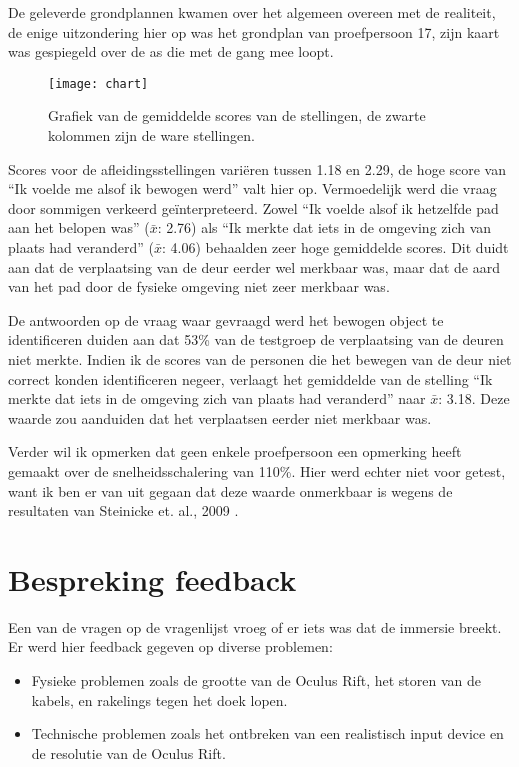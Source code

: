 De geleverde grondplannen kwamen over het algemeen overeen met de realiteit, de
enige uitzondering hier op was het grondplan van proefpersoon 17, zijn kaart was
gespiegeld over de as die met de gang mee loopt.

\begin{figure}[h!]
    \centering
    \texttt{[image: chart]}
    \caption{Grafiek van de gemiddelde scores van de stellingen, de zwarte 
    kolommen zijn de ware stellingen.}
    \label{fig:chart}
\end{figure}

Scores voor de afleidingsstellingen vari\"eren tussen 1.18 en 2.29, de hoge score
van ``Ik voelde me alsof ik bewogen werd'' valt hier op. Vermoedelijk werd die
vraag door sommigen verkeerd ge\"interpreteerd. Zowel ``Ik voelde alsof ik 
hetzelfde pad aan het belopen was'' ($\bar{x}$: 2.76) als ``Ik merkte dat iets in
de omgeving zich van plaats had veranderd'' ($\bar{x}$: 4.06) behaalden zeer hoge
gemiddelde scores. Dit duidt aan dat de verplaatsing van de deur eerder wel
merkbaar was, maar dat de aard van het pad door de fysieke omgeving niet zeer
merkbaar was.

De antwoorden op de vraag waar gevraagd werd het bewogen object te identificeren
duiden aan dat 53\% van de testgroep de verplaatsing van de deuren niet merkte.
Indien ik de scores van de personen die het bewegen van de deur niet correct 
konden identificeren negeer, verlaagt het gemiddelde van de stelling ``Ik merkte 
dat iets in de omgeving zich van plaats had veranderd'' naar $\bar{x}$: 3.18.
Deze waarde zou aanduiden dat het verplaatsen eerder niet merkbaar was.

Verder wil ik opmerken dat geen enkele proefpersoon een opmerking heeft gemaakt
over de snelheidsschalering van 110\%. Hier werd echter niet voor getest, want ik
ben er van uit gegaan dat deze waarde onmerkbaar is wegens de resultaten van
Steinicke et. al., 2009 \cite{steinicke09}.


\section{Bespreking feedback}
Een van de vragen op de vragenlijst vroeg of er iets was dat de immersie breekt.
Er werd hier feedback gegeven op diverse problemen:

\begin{itemize}
  \item Fysieke problemen zoals de grootte van de Oculus Rift, het storen van de
        kabels, en rakelings tegen het doek lopen.
  \item Technische problemen zoals het ontbreken van een realistisch input device
        en de resolutie van de Oculus Rift.
\end{itemize}

